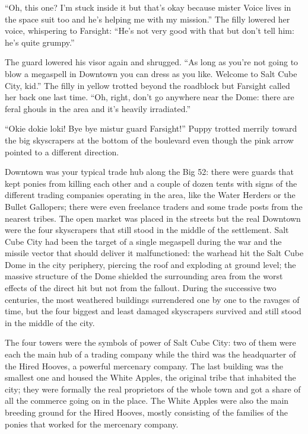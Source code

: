 ``Oh, this one? I'm stuck inside it but that's okay because mister Voice lives in the space suit too and he's helping me with my mission.'' The filly lowered her voice, whispering to Farsight: ``He's not very good with that but don't tell him: he's quite grumpy.''

The guard lowered his visor again and shrugged. ``As long as you're not going to blow a megaspell in Downtown you can dress as you like. Welcome to Salt Cube City, kid.'' The filly in yellow trotted beyond the roadblock but Farsight called her back one last time. ``Oh, right, don't go anywhere near the Dome: there are feral ghouls in the area and it's heavily irradiated.''

``Okie dokie loki! Bye bye mistur guard Farsight!'' Puppy trotted merrily toward the big skyscrapers at the bottom of the boulevard even though the pink arrow pointed to a different direction.

Downtown was your typical trade hub along the Big 52: there were guards that kept ponies from killing each other and a couple of dozen tents with signs of the different trading companies operating in the area, like the Water Herders or the Bullet Gallopers; there were even freelance traders and some trade posts from the nearest tribes. The open market was placed in the streets but the real Downtown were the four skyscrapers that still stood in the middle of the settlement. Salt Cube City had been the target of a single megaspell during the war and the missile vector that should deliver it malfunctioned: the warhead hit the Salt Cube Dome in the city periphery, piercing the roof and exploding at ground level; the massive structure of the Dome shielded the surrounding area from the worst effects of the direct hit but not from the fallout. During the successive two centuries, the most weathered buildings surrendered one by one to the ravages of time, but the four biggest and least damaged skyscrapers survived and still stood in the middle of the city.

The four towers were the symbols of power of Salt Cube City: two of them were each the main hub of a trading company while the third was the headquarter of the Hired Hooves, a powerful mercenary company. The last building was the smallest one and housed the White Apples, the original tribe that inhabited the city; they were formally the real proprietors of the whole town and got a share of all the commerce going on in the place. The White Apples were also the main breeding ground for the Hired Hooves, mostly consisting of the families of the ponies that worked for the mercenary company.

